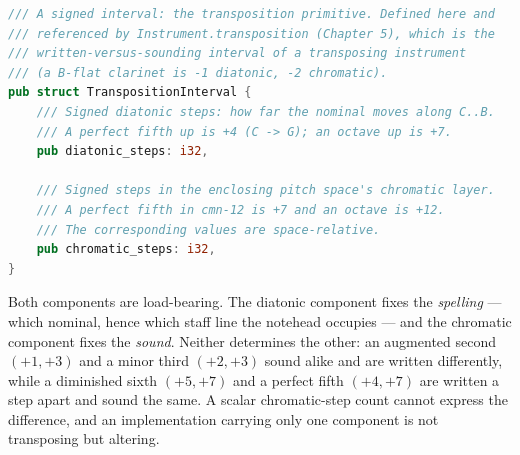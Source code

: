 \documentclass[11pt,letterpaper]{report}
\begin{document}
\begin{lstlisting}[language=Rust]
/// A signed interval: the transposition primitive. Defined here and
/// referenced by Instrument.transposition (Chapter 5), which is the
/// written-versus-sounding interval of a transposing instrument
/// (a B-flat clarinet is -1 diatonic, -2 chromatic).
pub struct TranspositionInterval {
    /// Signed diatonic steps: how far the nominal moves along C..B.
    /// A perfect fifth up is +4 (C -> G); an octave up is +7.
    pub diatonic_steps: i32,

    /// Signed steps in the enclosing pitch space's chromatic layer.
    /// A perfect fifth in cmn-12 is +7 and an octave is +12.
    /// The corresponding values are space-relative.
    pub chromatic_steps: i32,
}
\end{lstlisting}

Both components are load-bearing. The diatonic component fixes the
\emph{spelling} --- which nominal, hence which staff line the notehead
occupies --- and the chromatic component fixes the \emph{sound}. Neither
determines the other: an augmented second $(+1, +3)$ and a minor third
$(+2, +3)$ sound alike and are written differently, while a diminished
sixth $(+5, +7)$ and a perfect fifth $(+4, +7)$ are written a step apart
and sound the same. A scalar chromatic-step count cannot express the
difference, and an implementation carrying only one component is not
transposing but altering.
\end{document}
